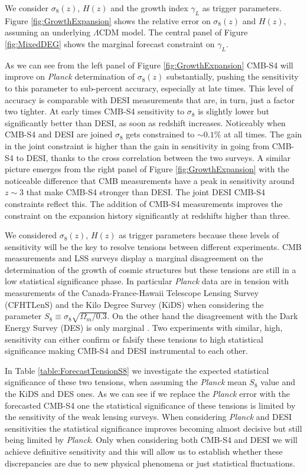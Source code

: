 We consider $\sigma_8(z)$, $H(z)$ and the growth index $\gamma_{L}$ as trigger parameters. Figure \ref{fig:GrowthExpansion} shows the relative error on $\sigma_8(z)$ and $H(z)$, assuming an underlying $\Lambda$CDM model. The central panel of Figure \ref{fig:MixedDEG} shows the marginal forecast constraint on $\gamma_{L}$. 

As we can see from the left panel of Figure \ref{fig:GrowthExpansion} CMB-S4 will improve on {\it Planck} determination of $\sigma_{8}(z)$ substantially, pushing the sensitivity to this parameter to sub-percent accuracy, especially at late times. 
This level of accuracy is comparable with DESI measurements that are, in turn, just a factor two tighter.
At early times CMB-S4 sensitivity to $\sigma_{8}$ is slightly lower but significantly better than DESI, as soon as redshift increases.
Noticeably when CMB-S4 and DESI are joined $\sigma_{8}$ gets constrained to $\sim 0.1\%$ at all times. The gain in the joint constraint is higher than the gain in sensitivity in going from CMB-S4 to DESI, thanks to the cross correlation between the two surveys.
%
A similar picture emerges from the right panel of Figure \ref{fig:GrowthExpansion} with the noticeable difference that CMB measurements have a peak in sensitivity around $z\sim 3$ that make CMB-S4 stronger than DESI. The joint DESI CMB-S4 constraints reflect this. The addition of CMB-S4 measurements improves the constraint on the expansion history significantly at redshifts higher than three.

We considered $\sigma_8(z)$, $H(z)$ as trigger parameters because these levels of sensitivity will be the key to resolve tensions between different experiments. 
CMB measurements and LSS surveys display a marginal disagreement on the determination of the growth of cosmic structures but these tensions are still in a low statistical significance phase.
In particular {\it Planck} data are in tension with measurements of the Canada-France-Hawaii Telescope Lensing Survey (CFHTLenS) \cite{Joudaki:2016mvz} and the Kilo Degree Survey (KiDS) \cite{Hildebrandt:2016iqg} when considering the parameter $S_8\equiv \sigma_8\sqrt{\Omega_m/0.3}$. 
On the other hand the disagreement with the Dark Energy Survey (DES) is only marginal \cite{Abbott:2015swa}.
Two experiments with similar, high, sensitivity can either confirm or falsify these tensions to high statistical significance making CMB-S4 and DESI instrumental to each other.

In Table \ref{table:ForecastTensionS8} we investigate the expected statistical significance of these two tensions, when assuming the {\it Planck} mean $S_8$ value and the KiDS and DES ones. As we can see if we replace the {\it Planck} error with the forecasted CMB-S4 one the statistical significance of these tensions is limited by the sensitivity of the weak lensing surveys. When considering {\it Planck} and DESI sensitivities the statistical significance improves becoming almost decisive but still being limited by {\it Planck}. Only when considering both CMB-S4 and DESI we will achieve definitive sensitivity and this will allow us to establish whether these discrepancies are due to new physical phenomena or just statistical fluctuations.

